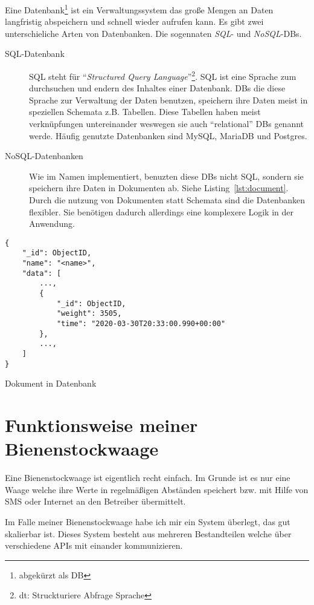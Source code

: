 \documentclass[a4paper, ngerman, 11pt]{scrartcl}
\begin{document}
Eine Datenbank\footnote{abgekürzt als DB} ist ein Verwaltungssystem das große Mengen an Daten langfristig abspeichern und schnell wieder aufrufen kann.
Es gibt zwei unterschieliche Arten von Datenbanken. Die sogennaten \emph{SQL}- und \emph{NoSQL}-DBs.

\begin{description}
	\item[SQL-Datenbank] SQL steht für \enquote{\emph{Structured Query Language}}\footnote{dt: Struckturiere Abfrage Sprache}.
		SQL ist eine Sprache zum durchsuchen und endern des Inhaltes einer Datenbank.
		DBs die diese Sprache zur Verwaltung der Daten benutzen, speichern ihre Daten meist in speziellen Schemata z.B. Tabellen.
		Diese Tabellen haben meist verknüpfungen untereinander weswegen sie auch \enquote{relational} DBs genannt werde.
		Häufig genutzte Datenbanken sind MySQL, MariaDB und Postgres.
	\item[NoSQL-Datenbanken] Wie im Namen implementiert, benuzten diese DBs nicht SQL, sondern sie speichern ihre Daten in Dokumenten ab. Siehe Listing~\ref{lst:document}.
		Durch die nutzung von Dokumenten statt Schemata sind die Datenbanken flexibler.
		Sie benötigen dadurch allerdings eine komplexere Logik in der Anwendung.
\end{description}

\begin{listing}[H]
\begin{verbatim}
{
    "_id": ObjectID,
    "name": "<name>",
    "data": [
        ...,
        {
            "_id": ObjectID,
            "weight": 3505,
            "time": "2020-03-30T20:33:00.990+00:00"
        },
        ...,
    ]
}
\end{verbatim}
\caption{Dokument in Datenbank\label{lst:document}}
\end{listing}
\section{Funktionsweise meiner Bienenstockwaage}\label{sec:function}

Eine Bienenstockwaage ist eigentlich recht einfach.
Im Grunde ist es nur eine Waage welche ihre Werte in regelmäßigen Abständen speichert bzw.
mit Hilfe von SMS oder Internet an den Betreiber übermittelt.

Im Falle meiner Bienenstockwaage habe ich mir ein System überlegt, das gut skalierbar ist.
Dieses System besteht aus mehreren Bestandteilen welche über verschiedene APIs mit einander kommunizieren.
\end{document}
